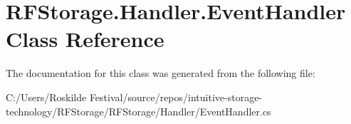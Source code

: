 \hypertarget{class_r_f_storage_1_1_handler_1_1_event_handler}{}\section{R\+F\+Storage.\+Handler.\+Event\+Handler Class Reference}
\label{class_r_f_storage_1_1_handler_1_1_event_handler}


The documentation for this class was generated from the following file\+:\begin{DoxyCompactItemize}
\item 
C\+:/\+Users/\+Roskilde Festival/source/repos/intuitive-\/storage-\/technology/\+R\+F\+Storage/\+R\+F\+Storage/\+Handler/Event\+Handler.\+cs\end{DoxyCompactItemize}
